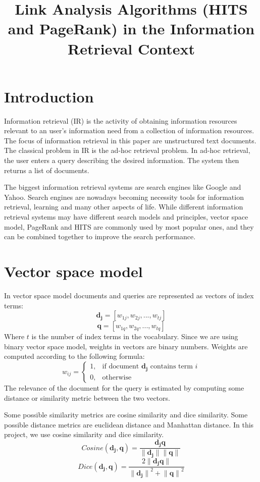 \documentclass[10pt, a4paper]{article}
\title{Link Analysis Algorithms (HITS and PageRank) in the Information Retrieval Context}
\begin{document}
\maketitleabstract

\section{Introduction}
Information retrieval (IR) is the activity of obtaining information resources relevant to an user’s information need from a collection of information resources. The focus of information retrieval in this paper are unstructured text documents. The classical problem in IR is the ad-hoc retrieval problem. In ad-hoc retrieval, the user enters a query describing the desired information. The system then returns a list of documents.

The biggest information retrieval systems are search engines like Google and Yahoo. Search engines are nowadays becoming necessity tools for information retrieval, learning and many other aspects of life. While different information retrieval systems may have different search models and principles, vector space model, PageRank and HITS are commonly used by most popular ones, and they can be combined together to improve the search performance.

\section{Vector space model}
In vector space model documents and queries are represented as vectors of index terms:
$$\mathbf{d_j} = [w_{1j}, w_{2j},..., w_{tj}]$$
$$\mathbf{q} = [w_{1q}, w_{2q},..., w_{tq}]$$
Where $t$ is the number of index terms in the vocabulary. Since we are using binary vector space model, weights in vectors are binary numbers. Weights are computed according to the following formula:
$$
w_{ij} = 
\begin{cases}
  1,& \text{if document } \mathbf{d_j} \text{ contains term } i\\
    0,              & \text{otherwise}
\end{cases}
$$
The relevance of the document for the query is estimated by computing some distance or similarity metric between the two vectors.

Some possible similarity metrics are cosine similarity and dice similarity. Some possible distance metrics are euclidean distance and Manhattan distance. In this project, we use cosine similarity and dice similarity.
$$Cosine(\mathbf{d_j}, \mathbf{q}) = \frac{\mathbf{d_j} \mathbf{q}}{\lVert \mathbf{d_j} \rVert \lVert \mathbf{q} \rVert}$$
$$Dice(\mathbf{d_j}, \mathbf{q}) = 
\frac{2\lVert \mathbf{d_j} \mathbf{q} \rVert}{{\lVert \mathbf{d_j} \rVert}^2 + {\lVert \mathbf{q} \rVert}^2}$$
\end{document}
